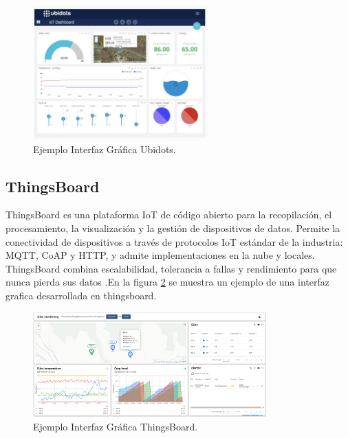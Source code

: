 \begin{figure}[htbp]
	\centering
	\includegraphics[width=0.6\textwidth]{./Figures/ubidots.png}
	\caption{Ejemplo Interfaz Gráfica Ubidots.}
	\label{fig:InterfazUBIDOTS}
\end{figure}
\subsection{ThingsBoard}
ThingsBoard es una plataforma IoT de código abierto para la recopilación, el procesamiento, la visualización y la gestión de dispositivos de datos.
Permite la conectividad de dispositivos a través de protocolos IoT estándar de la industria: MQTT, CoAP y HTTP, y admite implementaciones en la nube y locales. ThingsBoard combina escalabilidad, tolerancia a fallas y rendimiento para que nunca pierda sus datos \citep{THINGSBOARD}.En la figura \ref{fig:InterfazThingsBoard} se muestra un ejemplo de una interfaz grafica desarrollada en thingsboard. 
\begin{figure}[htbp]
	\centering
	\includegraphics[width=0.8\textwidth]{./Figures/thingsboard.png}
	\caption{Ejemplo Interfaz Gráfica ThingsBoard.}
	\label{fig:InterfazThingsBoard}
\end{figure}